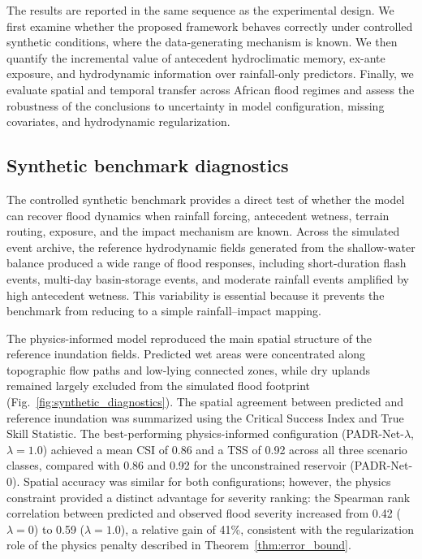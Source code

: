 \documentclass[pdflatex,sn-mathphys-ay]{sn-jnl}
\theoremstyle{thmstyleone}
\theoremstyle{thmstylethree}
\theoremstyle{thmstyletwo}
\begin{document}
The results are reported in the same sequence as the experimental
design.  We first examine whether the proposed framework behaves
correctly under controlled synthetic conditions, where the
data-generating mechanism is known.  We then quantify the incremental
value of antecedent hydroclimatic memory, ex-ante exposure, and
hydrodynamic information over rainfall-only predictors.  Finally, we
evaluate spatial and temporal transfer across African flood regimes and
assess the robustness of the conclusions to uncertainty in model
configuration, missing covariates, and hydrodynamic regularization.

\subsection{Synthetic benchmark diagnostics}
\label{subsec:synthetic_results}

The controlled synthetic benchmark provides a direct test of whether
the model can recover flood dynamics when rainfall forcing,
antecedent wetness, terrain routing, exposure, and the impact mechanism
are known.  Across the simulated event archive, the reference
hydrodynamic fields generated from the shallow-water balance produced
a wide range of flood responses, including short-duration flash events,
multi-day basin-storage events, and moderate rainfall events amplified
by high antecedent wetness.  This variability is essential because it
prevents the benchmark from reducing to a simple rainfall--impact
mapping.

The physics-informed model reproduced the main spatial structure of
the reference inundation fields.  Predicted wet areas were concentrated
along topographic flow paths and low-lying connected zones, while dry
uplands remained largely excluded from the simulated flood footprint
(Fig.~\ref{fig:synthetic_diagnostics}).  The spatial agreement between
predicted and reference inundation was summarized using the Critical
Success Index and True Skill Statistic.  The best-performing
physics-informed configuration (PADR-Net-$\lambda$, $\lambda=1.0$)
achieved a mean CSI of 0.86 and a TSS of 0.92 across all three scenario
classes, compared with 0.86 and 0.92 for the unconstrained reservoir
(PADR-Net-0).  Spatial accuracy was similar for both configurations;
however, the physics constraint provided a distinct advantage for
severity ranking: the Spearman rank correlation between predicted and
observed flood severity increased from 0.42 ($\lambda=0$) to 0.59
($\lambda=1.0$), a relative gain of 41\%, consistent with the
regularization role of the physics penalty described in
Theorem~\ref{thm:error_bound}.
\end{document}
